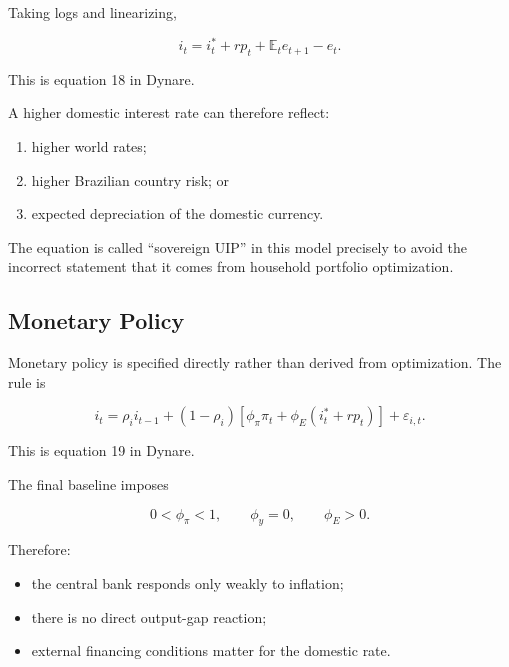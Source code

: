 Taking logs and linearizing,

\begin{equation}
\boxed{
i_t
=
i_t^{*}
+
rp_t
+
\mathbb E_te_{t+1}
-
e_t.
}
\label{eq:uip_final}
\end{equation}

This is equation 18 in Dynare.

A higher domestic interest rate can therefore reflect:

\begin{enumerate}
    \item higher world rates;
    \item higher Brazilian country risk; or
    \item expected depreciation of the domestic currency.
\end{enumerate}

The equation is called ``sovereign UIP'' in this model precisely to avoid the
incorrect statement that it comes from household portfolio optimization.

\subsection{Monetary Policy}
\label{app:monetarypolicy}

Monetary policy is specified directly rather than derived from optimization.
The rule is

\begin{equation}
\boxed{
i_t
=
\rho_i i_{t-1}
+
(1-\rho_i)
\left[
\phi_{\pi}\pi_t
+
\phi_E(i_t^{*}+rp_t)
\right]
+
\varepsilon_{i,t}.
}
\label{eq:policy_final}
\end{equation}

This is equation 19 in Dynare.

The final baseline imposes

\begin{equation}
0<\phi_{\pi}<1,
\qquad
\phi_y=0,
\qquad
\phi_E>0.
\end{equation}

Therefore:

\begin{itemize}
    \item the central bank responds only weakly to inflation;
    \item there is no direct output-gap reaction;
    \item external financing conditions matter for the domestic rate.
\end{itemize}

